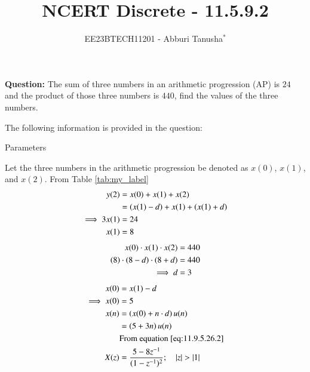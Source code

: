 \documentclass[journal,12pt,twocolumn]{IEEEtran}
\theoremstyle{remark}
\begin{document}

\vspace{3cm}

\title{NCERT Discrete - 11.5.9.2}
\author{EE23BTECH11201 - Abburi Tanusha$^{*}$%
}
\maketitle
\newpage
\bigskip

\renewcommand{\thefigure}{\theenumi}
\renewcommand{\thetable}{\theenumi}

\vspace{3cm}

\maketitle
\textbf{Question:} 
The sum of three numbers in an arithmetic progression (AP) is $24$ and the product of those three numbers is $440$, find the values of the three numbers.

\solution
The following information is provided in the question:
\begin{table}[h]
 	\centering
 	\resizebox{6 cm}{!}{
 		
 	}
 	\vspace{6 pt}
 	\caption{Parameters}
 	\label{tab:my_label} 
 \end{table}
\newline
Let the three numbers in the arithmetic progression be denoted as $x(0)$, $x(1)$, and $x(2)$.
\newline
From Table \ref{tab:my_label}
\begin{align}
  y(2) &= x(0) + x(1) + x(2) \\ 
    &= \left(x(1) - d \right) + x(1) + \left(x(1) + d\right) \\
    \implies 3x(1) &= 24 \\ 
    x(1) &= 8 
\end{align}
\begin{align}
   x(0) \cdot x(1) \cdot x(2) &= 440  \\
    \left(8\right) \cdot \left(8-d\right) \cdot \left(8+d\right) &= 440  \\
  \implies d &= 3   
\end{align}
\begin{align}
     x(0) &= x(1) - d \\
     \implies x(0) &= 5  \\
    x(n) &= \left(x(0) + n \cdot d\right) u(n)  \\
         &= \left(5 + 3n\right)u(n)  \\
         &\text{From equation \eqref{eq:11.9.5.26.2}}  \\
    X(z) &= \frac{5 - 8z^{-1}}{(1-z^{-1})^2} ; \quad \left\vert z\right\vert>\left\vert1\right\vert 
\end{align}
\end{document}
